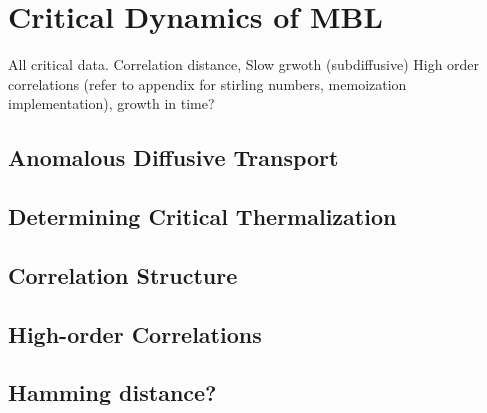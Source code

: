 %

\chapter{Critical Dynamics of MBL}

All critical data. Correlation distance, Slow grwoth (subdiffusive) High order correlations (refer to appendix for stirling numbers, memoization implementation), growth in time?

\section{Anomalous Diffusive Transport}

\section{Determining Critical Thermalization}

\section{Correlation Structure}

\section{High-order Correlations}

\section{Hamming distance?}





